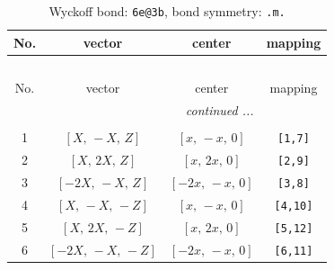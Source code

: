 \documentclass[fleqn,8pt]{jsarticle}
\begin{document}
\renewcommand{\arraystretch}{1.2}
\begin{longtable}{cccc}
\caption{Wyckoff bond: {\tt 6e@3b}, bond symmetry: {\tt .m.}}
 \\
 \hline \hline
No. & vector & center & mapping \\ \hline \endfirsthead

\multicolumn{3}{l}{\tablename\ \thetable{}} \\
 \hline \hline
No. & vector & center & mapping \\ \hline \endhead

 \hline \hline
\multicolumn{3}{r}{\footnotesize\it continued ...} \\ \endfoot

 \hline \hline
\multicolumn{3}{r}{} \\ \endlastfoot

1 & $\left[ X,\, - X,\, Z \right]$ & $\left[ x,\, - x,\, 0 \right]$ & {\tt [1,7]} \\ \hline
2 & $\left[ X,\, 2 X,\, Z \right]$ & $\left[ x,\, 2 x,\, 0 \right]$ & {\tt [2,9]} \\ \hline
3 & $\left[ - 2 X,\, - X,\, Z \right]$ & $\left[ - 2 x,\, - x,\, 0 \right]$ & {\tt [3,8]} \\ \hline
4 & $\left[ X,\, - X,\, - Z \right]$ & $\left[ x,\, - x,\, 0 \right]$ & {\tt [4,10]} \\ \hline
5 & $\left[ X,\, 2 X,\, - Z \right]$ & $\left[ x,\, 2 x,\, 0 \right]$ & {\tt [5,12]} \\ \hline
6 & $\left[ - 2 X,\, - X,\, - Z \right]$ & $\left[ - 2 x,\, - x,\, 0 \right]$ & {\tt [6,11]} \\
\end{longtable}
\renewcommand{\arraystretch}{1.2}
\end{document}
